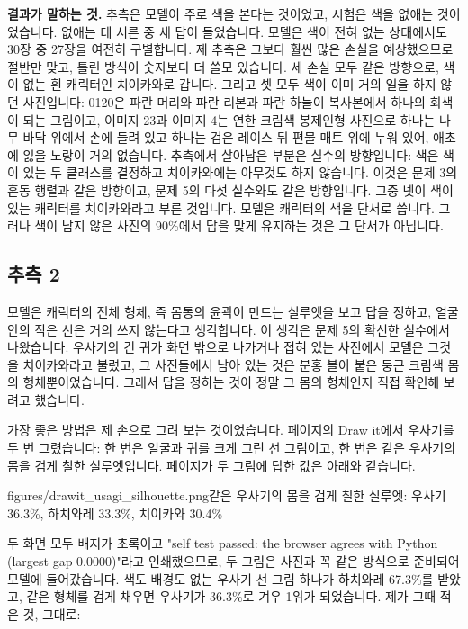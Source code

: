 \documentclass[11pt]{article}
\begin{document}
\textbf{결과가 말하는 것.} 추측은 모델이 주로 색을 본다는 것이었고, 시험은 색을
없애는 것이었습니다. 없애는 데 서른 중 세 답이 들었습니다. 모델은 색이 전혀
없는 상태에서도 30장 중 27장을 여전히 구별합니다. 제 추측은 그보다 훨씬 많은
손실을 예상했으므로 절반만 맞고, 틀린 방식이 숫자보다 더 쓸모 있습니다. 세
손실 모두 같은 방향으로, 색이 없는 흰 캐릭터인 치이카와로 갑니다. 그리고 셋
모두 색이 이미 거의 일을 하지 않던 사진입니다: 0120은 파란 머리와 파란 리본과
파란 하늘이 복사본에서 하나의 회색이 되는 그림이고, 이미지 23과 이미지 4는
연한 크림색 봉제인형 사진으로 하나는 나무 바닥 위에서 손에 들려 있고 하나는
검은 레이스 뒤 편물 매트 위에 누워 있어, 애초에 잃을 노랑이 거의 없습니다.
추측에서 살아남은 부분은 실수의 방향입니다: 색은 색이 있는 두 클래스를
결정하고 치이카와에는 아무것도 하지 않습니다. 이것은 문제 3의 혼동 행렬과 같은
방향이고, 문제 5의 다섯 실수와도 같은 방향입니다. 그중 넷이 색이 있는
캐릭터를 치이카와라고 부른 것입니다. 모델은 캐릭터의 색을 단서로 씁니다.
그러나 색이 남지 않은 사진의 90\%에서 답을 맞게 유지하는 것은 그 단서가
아닙니다.

\subsection*{추측 2}

모델은 캐릭터의 전체 형체, 즉 몸통의 윤곽이 만드는 실루엣을 보고 답을 정하고,
얼굴 안의 작은 선은 거의 쓰지 않는다고 생각합니다. 이 생각은 문제 5의 확신한
실수에서 나왔습니다. 우사기의 긴 귀가 화면 밖으로 나가거나 접혀 있는 사진에서
모델은 그것을 치이카와라고 불렀고, 그 사진들에서 남아 있는 것은 분홍 볼이 붙은
둥근 크림색 몸의 형체뿐이었습니다. 그래서 답을 정하는 것이 정말 그 몸의
형체인지 직접 확인해 보려고 했습니다.

가장 좋은 방법은 제 손으로 그려 보는 것이었습니다. 페이지의 Draw it에서 우사기를
두 번 그렸습니다: 한 번은 얼굴과 귀를 크게 그린 선 그림이고, 한 번은 같은
우사기의 몸을 검게 칠한 실루엣입니다. 페이지가 두 그림에 답한 값은 아래와
같습니다.

           {figures/drawit_usagi_silhouette.png}{같은 우사기의 몸을 검게 칠한
실루엣: 우사기 36.3\%, 하치와레 33.3\%, 치이카와 30.4\%}

두 화면 모두 배지가 초록이고 "self test passed: the browser agrees with Python
(largest gap 0.0000)"라고 인쇄했으므로, 두 그림은 사진과 꼭 같은 방식으로
준비되어 모델에 들어갔습니다. 색도 배경도 없는 우사기 선 그림 하나가
하치와레 67.3\%를 받았고, 같은 형체를 검게 채우면 우사기가 36.3\%로 겨우
1위가 되었습니다. 제가 그때 적은 것, 그대로:
\end{document}
